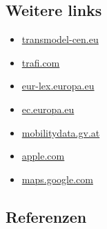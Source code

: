 \documentclass[
]{book}
\providecommand{\tightlist}{%
  \setlength{\itemsep}{0pt}\setlength{\parskip}{0pt}}
\begin{document}
\hypertarget{weitere-links-17}{%
\subsection*{Weitere links}\label{weitere-links-17}}

\begin{itemize}
\tightlist
\item
  \href{http://www.transmodel-cen.eu/}{transmodel-cen.eu}
\item
  \href{https://www.trafi.com/}{trafi.com}
\item
  \href{https://eur-lex.europa.eu/legal-content/EN/TXT/?uri=CELEX\%3A32017R1926}{eur-lex.europa.eu}
\item
  \href{https://ec.europa.eu/transport/sites/transport/files/2020-02-implementation-handbook-delegated-reg20171926.pdf}{ec.europa.eu}
\item
  \href{https://www.mobilitydata.gv.at/}{mobilitydata.gv.at}
\item
  \href{https://www.apple.com/maps/}{apple.com}
\item
  \href{http://maps.google.com/landing/transit/cities/index.html\#Europe}{maps.google.com}
\end{itemize}

\hypertarget{referenzen-21}{%
\subsection*{Referenzen}\label{referenzen-21}}
\end{document}
